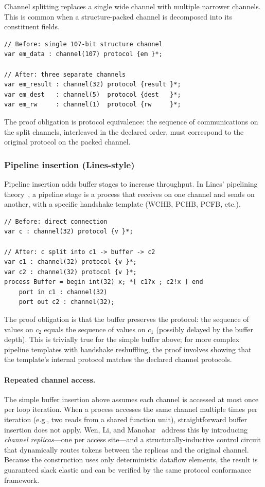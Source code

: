 \documentclass[11pt]{article}
\begin{document}
Channel splitting replaces a single wide channel with multiple
narrower channels.  This is common when a structure-packed channel is
decomposed into its constituent fields.

\begin{Verbatim}[samepage=true]
// Before: single 107-bit structure channel
var em_data : channel(107) protocol {em }*;

// After: three separate channels
var em_result : channel(32) protocol {result }*;
var em_dest   : channel(5)  protocol {dest   }*;
var em_rw     : channel(1)  protocol {rw     }*;
\end{Verbatim}

The proof obligation is protocol equivalence: the sequence of
communications on the split channels, interleaved in the declared
order, must correspond to the original protocol on the packed channel.

\subsubsection{Pipeline insertion (Lines-style)}

Pipeline insertion adds buffer stages to increase throughput.
In Lines' pipelining theory~\cite{lines1998}, a pipeline stage is a
process that receives on one channel and sends on another, with a
specific handshake template (WCHB, PCHB, PCFB, etc.).

\begin{Verbatim}[samepage=true]
// Before: direct connection
var c : channel(32) protocol {v }*;

// After: c split into c1 -> buffer -> c2
var c1 : channel(32) protocol {v }*;
var c2 : channel(32) protocol {v }*;
process Buffer = begin int(32) x; *[ c1?x ; c2!x ] end
    port in c1 : channel(32)
    port out c2 : channel(32);
\end{Verbatim}

The proof obligation is that the buffer preserves the protocol: the
sequence of values on $c_2$ equals the sequence of values on $c_1$
(possibly delayed by the buffer depth).  This is trivially true for
the simple buffer above; for more complex pipeline templates with
handshake reshuffling, the proof involves showing that the template's
internal protocol matches the declared channel protocols.

\paragraph{Repeated channel access.}
The simple buffer insertion above assumes each channel is accessed at
most once per loop iteration.  When a process accesses the same
channel multiple times per iteration (e.g., two reads from a shared
function unit), straightforward buffer insertion does not apply.
Wen, Li, and Manohar~\cite{wen2025} address this by introducing
\emph{channel replicas}---one per access site---and a
structurally-inductive control circuit that dynamically routes tokens
between the replicas and the original channel.  Because the
construction uses only deterministic dataflow elements, the result is
guaranteed slack elastic and can be verified by the same protocol
conformance framework.
\end{document}
